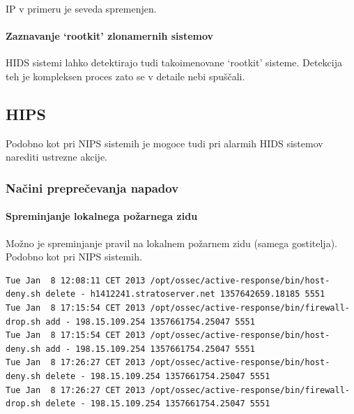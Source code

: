 \documentclass[12pt]{article}
\begin{document}
IP v primeru je seveda spremenjen.


\paragraph{Zaznavanje `rootkit' zlonamernih sistemov} %

HIDS sistemi lahko detektirajo tudi takoimenovane `rootkit' sisteme.
Detekcija teh je kompleksen proces zato se v detaile nebi spuščali.




\subsection{HIPS}

Podobno kot pri NIPS sistemih je mogoce tudi pri alarmih HIDS sistemov narediti ustrezne akcije.

\subsubsection{Načini preprečevanja napadov} %


\paragraph{Spreminjanje lokalnega požarnega zidu} %

Možno je spreminjanje pravil na lokalnem požarnem zidu (samega gostitelja).
Podobno kot pri NIPS sistemih.

\begin{verbatim}
Tue Jan  8 12:08:11 CET 2013 /opt/ossec/active-response/bin/host-deny.sh delete - h1412241.stratoserver.net 1357642659.18185 5551
Tue Jan  8 17:15:54 CET 2013 /opt/ossec/active-response/bin/firewall-drop.sh add - 198.15.109.254 1357661754.25047 5551
Tue Jan  8 17:15:54 CET 2013 /opt/ossec/active-response/bin/host-deny.sh add - 198.15.109.254 1357661754.25047 5551
Tue Jan  8 17:26:27 CET 2013 /opt/ossec/active-response/bin/host-deny.sh delete - 198.15.109.254 1357661754.25047 5551
Tue Jan  8 17:26:27 CET 2013 /opt/ossec/active-response/bin/firewall-drop.sh delete - 198.15.109.254 1357661754.25047 5551

\end{verbatim}
\end{document}

